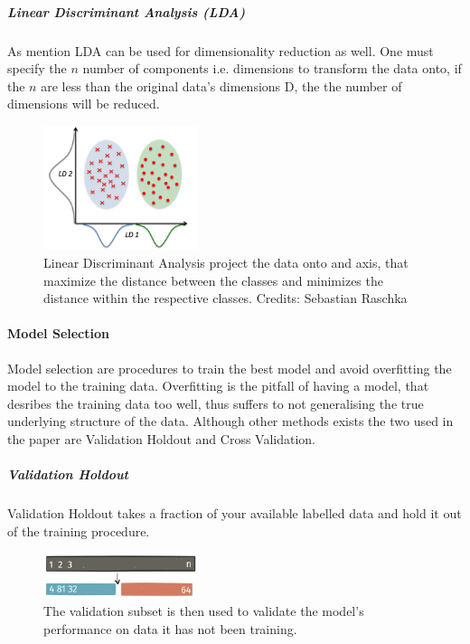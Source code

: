 \subparagraph{Linear Discriminant Analysis (LDA)}
As mention LDA can be used for dimensionality reduction as well. One must specify the $n$ number of components i.e. dimensions to transform the data onto, if the $n$ are less than the original data's dimensions D, the the number of dimensions will be reduced. 

\begin{figure}[H]
    \centering
    \includegraphics[width=0.4\textwidth]{figures/lda.png}
    \caption[]{Linear Discriminant Analysis project the data onto and axis, that maximize the distance between the classes and minimizes the distance within the respective classes. Credits: Sebastian Raschka}
    \label{fig:lda}
\end{figure}

\paragraph{Model Selection}

Model selection are procedures to train the best model and avoid overfitting the model to the training data. Overfitting is the pitfall of having a model, that desribes the training data too well, thus suffers to not generalising the true underlying structure of the data. Although other methods exists the two used in the paper are Validation Holdout and Cross Validation. 

\subparagraph{Validation Holdout}

Validation Holdout takes a fraction of your available labelled data and hold it out of the training procedure. 

\begin{figure}[H]
    \centering
    \includegraphics[width=0.4\textwidth]{figures/validationset.png}
    \caption[]{The validation subset is then used to validate the model's performance on data it has not been training.}
    \label{fig:val_holdout}
\end{figure}

